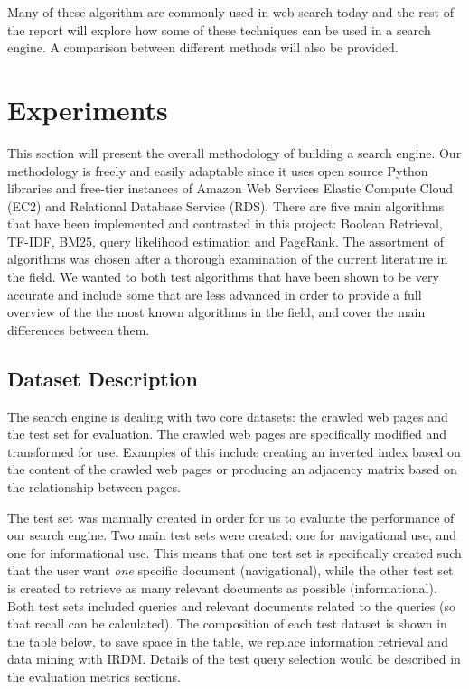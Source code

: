 Many of these algorithm are commonly used in web search today and the rest of the report will explore how some of these techniques can be used in a search engine. A comparison between different methods will also be provided.




\section{Experiments} %
\label{sec:experiment}

This section will present the overall methodology of building a search engine. Our methodology is freely and easily adaptable since it uses open source Python libraries and free-tier instances of Amazon Web Services Elastic Compute Cloud (EC2) and Relational Database Service (RDS). There are five main algorithms that have been implemented and contrasted in this project: Boolean Retrieval, TF-IDF, BM25, query likelihood estimation and PageRank. The assortment of algorithms was chosen after a thorough examination of the current literature in the field. We wanted to both test algorithms that have been shown to be very accurate and include some that are less advanced in order to provide a full overview of the the most known algorithms in the field, and cover the main differences between them. 

\subsection{Dataset Description} %
\label{sub:dataset_description}

The search engine is dealing with two core datasets: the crawled web pages and the test set for evaluation. The crawled web pages are specifically modified and transformed for use. Examples of this include creating an inverted index based on the content of the crawled web pages or producing an adjacency matrix based on the relationship between pages.

The test set was manually created in order for us to evaluate the performance of our search engine. Two main test sets were created: one for navigational use, and one for informational use. This means that one test set is specifically created such that the user want \emph{one} specific document (navigational), while the other test set is created to retrieve as many relevant documents as possible (informational). Both test sets included queries and relevant documents related to the queries (so that recall can be calculated). The composition of each test dataset is shown in the table below, to save space in the table, we replace information retrieval and data mining with IRDM. Details of the test query selection would be described in the evaluation metrics sections. 

